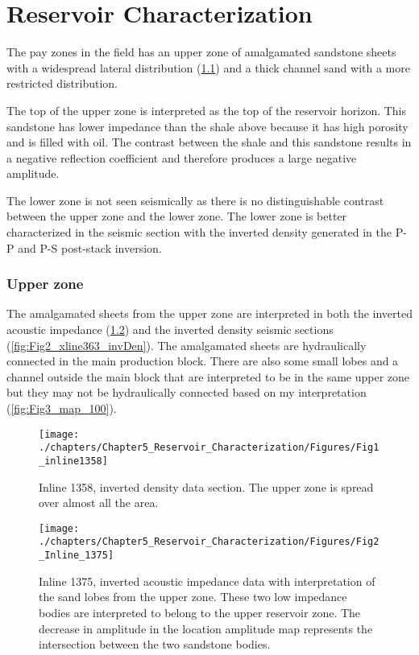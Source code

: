 \chapter{Reservoir Characterization}

The pay zones in the field has an upper zone of amalgamated sandstone sheets with a widespread lateral distribution (\ref{fig:inline1358_zoomout}) and a thick channel sand with a more restricted distribution. 

	The top of the upper zone is interpreted as the top of the reservoir horizon. This sandstone has lower impedance than the shale above because it has high porosity and is filled with oil. The contrast between the shale and this sandstone results in a negative reflection coefficient and therefore produces a large negative amplitude. 

	The lower zone is not seen seismically as there is no distinguishable contrast between the upper zone and the lower zone. The lower zone is better characterized in the seismic section with the inverted density generated in the P-P and P-S post-stack inversion.

\subsection{Upper zone}

The amalgamated sheets from the upper zone are interpreted in both the inverted acoustic impedance (\ref{fig:Fig1_Iline1375_Zp}) and the inverted density seismic sections (\ref{fig:Fig2_xline363_invDen}). The amalgamated sheets are hydraulically connected in the main production block. There are also some small lobes and a channel outside the main block that are interpreted to be in the same upper zone but they may not be hydraulically connected based on my interpretation (\ref{fig:Fig3_map_100}).


\begin{figure}[hbtp]
	\begin{center}
	\texttt{[image: ./chapters/Chapter5\_Reservoir\_Characterization/Figures/Fig1\_inline1358]}
			\caption[Inline 1358, inverted density data section.]{Inline 1358, inverted density data section. The upper zone is spread over almost all the area.}
			\label{fig:inline1358_zoomout}
		\end{center}
	\end{figure}	


\begin{figure}[hbtp]
	\begin{center}
	\texttt{[image: ./chapters/Chapter5\_Reservoir\_Characterization/Figures/Fig2\_Inline\_1375]}
			\caption[Inline 1375, inverted acoustic impedance with interpretation of the sand sheets from the upper zone.]{Inline 1375, inverted acoustic impedance data with interpretation of the sand lobes from the upper zone. These two low impedance bodies are interpreted to belong to the upper reservoir zone. The decrease in amplitude in the location amplitude map represents the intersection between the two sandstone bodies.}
			\label{fig:Fig1_Iline1375_Zp}
		\end{center}
	\end{figure}	
	
